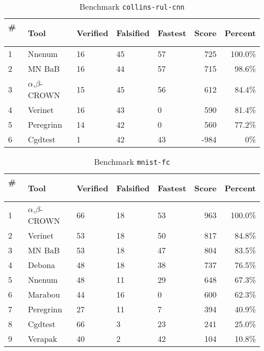 
\begin{table}[h]
\begin{center}
\caption{Benchmark \texttt{collins-rul-cnn}} \label{tab:cat_{cat}}
{\setlength{\tabcolsep}{2pt}
\begin{tabular}[h]{@{}lllllrr@{}}
\toprule
\textbf{\# ~} & \textbf{Tool} & \textbf{Verified} & \textbf{Falsified} & \textbf{Fastest} & \textbf{Score} & \textbf{Percent}\\
\midrule
1 & Nnenum & 16 & 45 & 57 & 725 & 100.0\% \\
2 & MN BaB & 16 & 44 & 57 & 715 & 98.6\% \\
3 & $\alpha$,$\beta$-CROWN & 15 & 45 & 56 & 612 & 84.4\% \\
4 & Verinet & 16 & 43 & 0 & 590 & 81.4\% \\
5 & Peregrinn & 14 & 42 & 0 & 560 & 77.2\% \\
6 & Cgdtest & 1 & 42 & 43 & -984 & 0\% \\
\bottomrule
\end{tabular}
}
\end{center}
\end{table}




\begin{table}[h]
\begin{center}
\caption{Benchmark \texttt{mnist-fc}} \label{tab:cat_{cat}}
{\setlength{\tabcolsep}{2pt}
\begin{tabular}[h]{@{}lllllrr@{}}
\toprule
\textbf{\# ~} & \textbf{Tool} & \textbf{Verified} & \textbf{Falsified} & \textbf{Fastest} & \textbf{Score} & \textbf{Percent}\\
\midrule
1 & $\alpha$,$\beta$-CROWN & 66 & 18 & 53 & 963 & 100.0\% \\
2 & Verinet & 53 & 18 & 50 & 817 & 84.8\% \\
3 & MN BaB & 53 & 18 & 47 & 804 & 83.5\% \\
4 & Debona & 48 & 18 & 38 & 737 & 76.5\% \\
5 & Nnenum & 48 & 11 & 29 & 648 & 67.3\% \\
6 & Marabou & 44 & 16 & 0 & 600 & 62.3\% \\
7 & Peregrinn & 27 & 11 & 7 & 394 & 40.9\% \\
8 & Cgdtest & 66 & 3 & 23 & 241 & 25.0\% \\
9 & Verapak & 40 & 2 & 42 & 104 & 10.8\% \\
\bottomrule
\end{tabular}
}
\end{center}
\end{table}



